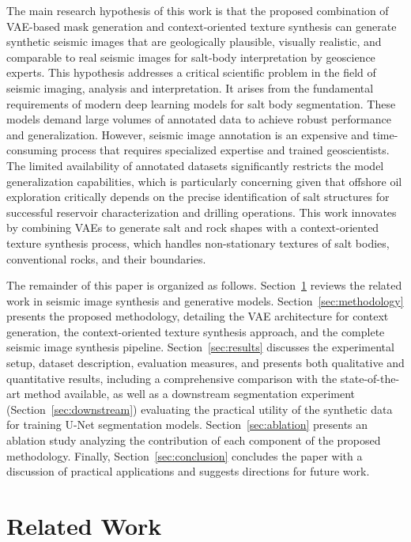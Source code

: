 \documentclass{ieeeaccess}
\begin{document}
The main research hypothesis of this work is that the proposed combination of VAE-based mask generation and context-oriented texture synthesis can generate synthetic seismic images that are geologically plausible, visually realistic, and comparable to real seismic images for salt-body interpretation by geoscience experts. This hypothesis addresses a critical scientific problem in the field of seismic imaging, analysis and interpretation. It arises from the fundamental requirements of modern deep learning models for salt body segmentation. These models demand large volumes of annotated data to achieve robust performance and generalization. However, seismic image annotation is an expensive and time-consuming process that requires specialized expertise and trained geoscientists. The limited availability of annotated datasets significantly restricts the model generalization capabilities, which is particularly concerning given that offshore oil exploration critically depends on the precise identification of salt structures for successful reservoir characterization and drilling operations. This work innovates by combining VAEs to generate salt and rock shapes with a context-oriented texture synthesis process, which handles non-stationary textures of salt bodies, conventional rocks, and their boundaries. 

The remainder of this paper is organized as follows. Section~\ref{sec:related} reviews the related work in seismic image synthesis and generative models. Section~\ref{sec:methodology} presents the proposed methodology, detailing the VAE architecture for context generation, the context-oriented texture synthesis approach, and the complete seismic image synthesis pipeline. Section~\ref{sec:results} discusses the experimental setup, dataset description, evaluation measures, and presents both qualitative and quantitative results, including a comprehensive comparison with the state-of-the-art method available, as well as a downstream segmentation experiment (Section~\ref{sec:downstream}) evaluating the practical utility of the synthetic data for training U-Net segmentation models. Section~\ref{sec:ablation} presents an ablation study analyzing the contribution of each component of the proposed methodology. Finally, Section~\ref{sec:conclusion} concludes the paper with a discussion of practical applications and suggests directions for future work.


\section{Related Work}
\label{sec:related}
\end{document}
